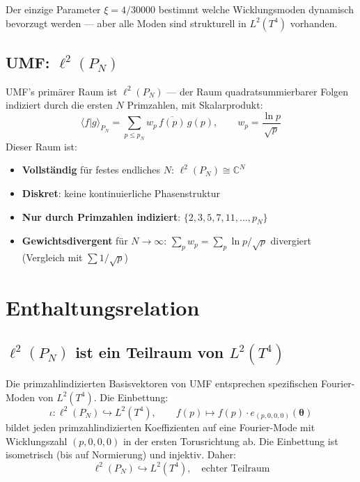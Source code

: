 Der einzige Parameter $\xi = 4/30000$ bestimmt welche Wicklungsmoden dynamisch
bevorzugt werden — aber alle Moden sind strukturell in $L^2(T^4)$ vorhanden.

\subsection{UMF: \texorpdfstring{$\ell^2(P_N)$}{ell2(P\_N)}}

UMF's primärer Raum ist $\ell^2(P_N)$ — der Raum quadratsummierbarer Folgen
indiziert durch die ersten $N$ Primzahlen, mit Skalarprodukt:
\begin{equation}
  \langle f | g \rangle_{P_N} = \sum_{p \leq p_N} w_p\, \overline{f(p)}\, g(p),
  \qquad w_p = \frac{\ln p}{\sqrt{p}}
  \tag{244.2}
\end{equation}
Dieser Raum ist:
\begin{itemize}
  \item \textbf{Vollständig} für festes endliches $N$: $\ell^2(P_N) \cong \mathbb{C}^N$
  \item \textbf{Diskret}: keine kontinuierliche Phasenstruktur
  \item \textbf{Nur durch Primzahlen indiziert}: $\{2, 3, 5, 7, 11, \ldots, p_N\}$
  \item \textbf{Gewichtsdivergent} für $N\to\infty$: $\sum_p w_p = \sum_p \ln p/\sqrt{p}$
    divergiert (Vergleich mit $\sum 1/\sqrt{p}$)
\end{itemize}

\section{Enthaltungsrelation}

\subsection{\texorpdfstring{$\ell^2(P_N)$}{ell2(P\_N)} ist ein Teilraum von \texorpdfstring{$L^2(T^4)$}{L2(T4)}}

Die primzahlindizierten Basisvektoren von UMF entsprechen spezifischen
Fourier-Moden von $L^2(T^4)$. Die Einbettung:
\begin{equation}
  \iota: \ell^2(P_N) \hookrightarrow L^2(T^4),
  \qquad f(p) \mapsto f(p)\cdot e_{(p,0,0,0)}(\symbf{\theta})
  \tag{244.3}
\end{equation}
bildet jeden primzahlindizierten Koeffizienten auf eine Fourier-Mode mit
Wicklungszahl $(p, 0, 0, 0)$ in der ersten Torusrichtung ab. Die Einbettung
ist isometrisch (bis auf Normierung) und injektiv. Daher:
\begin{equation}
  \boxed{\ell^2(P_N) \hookrightarrow L^2(T^4), \quad \text{echter Teilraum}}
  \tag{244.4}
\end{equation}

